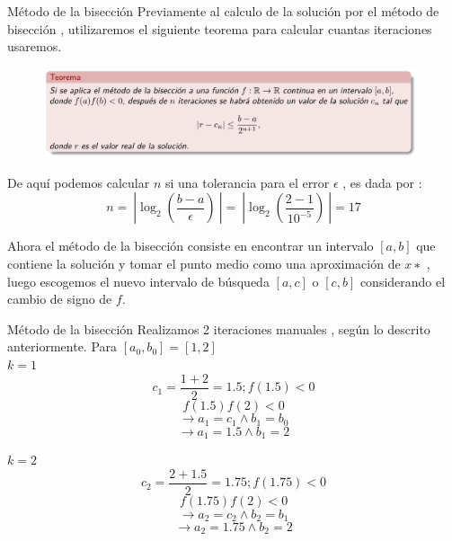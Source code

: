 \begin{frame}{Método de la bisección}
Previamente al calculo de la solución por el método de bisección , utilizaremos el siguiente teorema para calcular cuantas iteraciones usaremos.
        \begin{figure}
			\includegraphics[width=11cm]{p10-teorema2.png}
		\end{figure}
De aquí podemos calcular \(n\) si una tolerancia para el error \( \epsilon \) , es dada por :
\begin{equation*}
    n = \ | \log_2 (\frac{b-a}{\epsilon}) \ | = \ | \log_2 (\frac{2-1}{10^{-5}}) \ | = 17
\end{equation*}

Ahora el método de la bisección consiste en encontrar un intervalo \( [a, b] \) que contiene la solución y
tomar el punto medio como una aproximación de \( x∗ \) , luego escogemos el nuevo intervalo de
búsqueda \( [a, c] \) o \( [c, b] \) considerando el cambio de signo de \( f \).
\end{frame}

\begin{frame}{Método de la bisección}
    Realizamos 2 iteraciones manuales , según lo descrito anteriormente.
         Para \( [a_0 , b_0 ] = [1 , 2]\) \\
        \(  k = 1 \)
         \begin{equation*}
              c_1 = \frac{1+2}{2} = 1.5  ; f(1.5)<0 
         \end{equation*}
         \begin{equation*}
             f(1.5)f(2) <0  
         \end{equation*}
         \begin{equation*}
              \xrightarrow{} a_1 = c_1 \land b_1 = b_0 
         \end{equation*}
         \begin{equation*}
             \xrightarrow{} a_1 = 1.5 \land b_1 = 2
         \end{equation*}

        \(  k = 2 \)
         \begin{equation*}
              c_2 = \frac{2+1.5}{2} = 1.75  ; f(1.75)<0 
         \end{equation*}
         \begin{equation*}
             f(1.75)f(2) <0  
         \end{equation*}
         \begin{equation*}
              \xrightarrow{} a_2 = c_2 \land b_2 = b_1
         \end{equation*}
         \begin{equation*}
             \xrightarrow{} a_2 = 1.75 \land b_2 = 2
         \end{equation*}
\end{frame}


